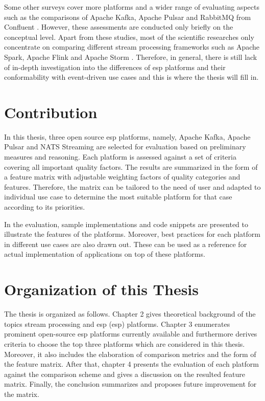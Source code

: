 Some other surveys cover more platforms and a wider range of evaluating aspects such as the comparisons of Apache Kafka, Apache Pulsar and RabbitMQ from Confluent \cite{overallcomparekafka} \cite{benchmarkkafkapulsarrabbitmq}. However, these assessments are conducted only briefly on the conceptual level. Apart from these studies, most of the scientific researches only concentrate on comparing different stream processing frameworks such as Apache Spark, Apache Flink and Apache Storm \cite{karimov2018benchmarking} \cite{isah2019survey} \cite{lopez2016performance}. Therefore, in general, there is still lack of in-depth investigation into the differences of \acrlong{esp} platforms and their conformability with event-driven use cases and this is where the thesis will fill in.
 
\section{Contribution}
In this thesis, three open source \acrlong{esp} platforms, namely, Apache Kafka, Apache Pulsar and NATS Streaming are selected for evaluation based on preliminary measures and reasoning. Each platform is assessed against a set of criteria covering all important quality factors. The results are summarized in the form of a feature matrix with adjustable weighting factors of quality categories and features. Therefore, the matrix can be tailored to the need of user and adapted to individual use case to determine the most suitable platform for that case according to its priorities.

In the evaluation, sample implementations and code snippets are presented to illustrate the features of the platforms. Moreover, best practices for each platform in different use cases are also drawn out. These can be used as a reference for actual implementation of applications on top of these platforms.

\section{Organization of this Thesis}
The thesis is organized as follows. Chapter 2 gives theoretical background of the topics stream processing and \acrlong{esp} (\acrshort{esp}) platforms. Chapter 3 enumerates prominent open-source \acrshort{esp} platforms currently available and furthermore derives criteria to choose the top three platforms which are considered in this thesis. Moreover, it also includes the elaboration of comparison metrics and the form of the feature matrix. After that, chapter 4 presents the evaluation of each platform against the comparison scheme and gives a discussion on the resulted feature matrix. Finally, the conclusion summarizes and proposes future improvement for the matrix.


